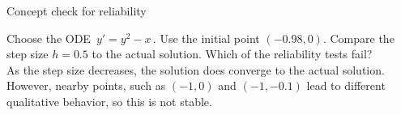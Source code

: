 \begin{exercise}
  Concept check for reliability
\end{exercise}

Choose the ODE $\, y' = y^2 - x\,$.
Use the initial point $(−0.98,0)$.
Compare the step size $h=0.5$ to the actual solution. Which of the reliability tests fail?\\

As the step size decreases,
the solution does converge to the actual solution.
However, nearby points, such as $(−1, 0)$ and $(−1, −0.1)$ lead to different qualitative behavior,
so this is not stable.

\clearpage
